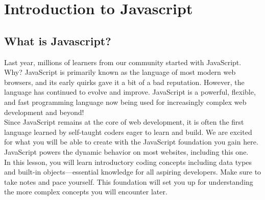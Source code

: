 \documentclass[11pt]{article}
\begin{document}
\section{Introduction to Javascript}
\subsection{What is Javascript? }
Last year, millions of learners from our community started with JavaScript. Why? JavaScript is primarily known as the language of most modern web browsers, and its early quirks gave it a bit of a bad reputation. However, the language has continued to evolve and improve. JavaScript is a powerful, flexible, and fast programming language now being used for increasingly complex web development and beyond! \\
\newline
Since JavaScript remains at the core of web development, it is often the first language learned by self-taught coders eager to learn and build. We are excited for what you will be able to create with the JavaScript foundation you gain here. JavaScript powers the dynamic behavior on most websites, including this one. \\
\newline
In this lesson, you will learn introductory coding concepts including data types and built-in objects—essential knowledge for all aspiring developers. Make sure to take notes and pace yourself. This foundation will set you up for understanding the more complex concepts you will encounter later. 
\end{document}
